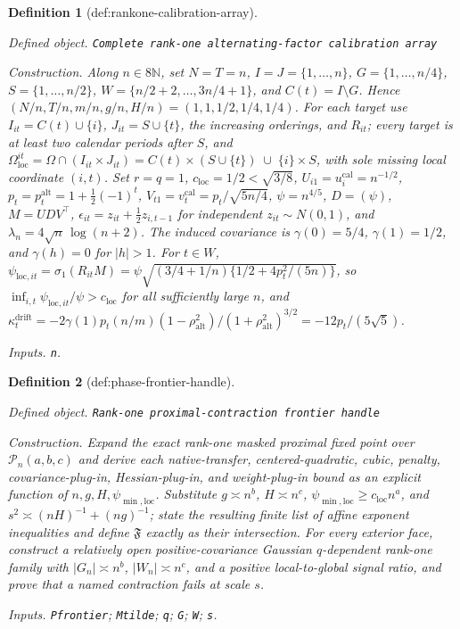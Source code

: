 \documentclass{article}
\newtheorem{definition}{Definition}
\begin{document}
\begin{definition}[def:rankone-calibration-array]\label{def:rankone-calibration-array}
\par\smallskip\noindent\emph{Defined object.} \texttt{Complete rank-\allowbreak{}one alternating-\allowbreak{}factor calibration array}
\par\smallskip\noindent\emph{Construction.} Along \(n\in8\mathbb N\), set \(N=T=n\), \(I=J=\{1,\ldots,n\}\), \(G=\{1,\ldots,n/4\}\), \(S=\{1,\ldots,n/2\}\), \(W=\{n/2+2,\ldots,3n/4+1\}\), and \(C(t)=I\setminus G\). Hence \((N/n,T/n,m/n,g/n,H/n)=(1,1,1/2,1/4,1/4)\). For each target use \(I_{it}=C(t)\cup\{i\}\), \(J_{it}=S\cup\{t\}\), the increasing orderings, and \(R_{it}\); every target is at least two calendar periods after \(S\), and \(\Omega_{\mathrm{loc}}^{it}=\Omega\cap(I_{it}\times J_{it})=C(t)\times(S\cup\{t\})\;\cup\;\{i\}\times S\), with sole missing local coordinate \((i,t)\). Set \(r=q=1\), \(c_{\mathrm{loc}}=1/2<\sqrt{3/8}\), \(U_{i1}=u^{\mathrm{cal}}_i=n^{-1/2}\), \(p_t=p^{\mathrm{alt}}_t=1+\tfrac12(-1)^t\), \(V_{t1}=v^{\mathrm{cal}}_t=p_t/\sqrt{5n/4}\), \(\psi=n^{4/5}\), \(D=(\psi)\), \(M=UDV^{\top}\), \(\epsilon_{it}=z_{it}+\tfrac12z_{i,t-1}\) for independent \(z_{it}\sim N(0,1)\), and \(\lambda_n=4\sqrt n\,\log(n+2)\). The induced covariance is \(\gamma(0)=5/4\), \(\gamma(1)=1/2\), and \(\gamma(h)=0\) for \(|h|>1\). For \(t\in W\), \(\psi_{\mathrm{loc},it}=\sigma_1(R_{it}M)=\psi\sqrt{(3/4+1/n)\{1/2+4p_t^2/(5n)\}}\), so \(\inf_{i,t}\psi_{\mathrm{loc},it}/\psi>c_{\mathrm{loc}}\) for all sufficiently large \(n\), and \(\kappa^{\mathrm{drift}}_t=-2\gamma(1)p_t(n/m)(1-\rho_{\mathrm{alt}}^2)/(1+\rho_{\mathrm{alt}}^2)^{3/2}=-12p_t/(5\sqrt5)\).
\par\smallskip\noindent\emph{Inputs.} \texttt{n}.
\end{definition}

\begin{definition}[def:phase-frontier-handle]\label{def:phase-frontier-handle}
\par\smallskip\noindent\emph{Defined object.} \texttt{Rank-\allowbreak{}one proximal-\allowbreak{}contraction frontier handle}
\par\smallskip\noindent\emph{Construction.} Expand the exact rank-one masked proximal fixed point over \(\mathcal P_n(a,b,c)\) and derive each native-transfer, centered-quadratic, cubic, penalty, covariance-plug-in, Hessian-plug-in, and weight-plug-in bound as an explicit function of \(n,g,H,\psi_{\min,\mathrm{loc}}\). Substitute \(g\asymp n^b\), \(H\asymp n^c\), \(\psi_{\min,\mathrm{loc}}\ge c_{\mathrm{loc}}n^a\), and \(s^2\asymp(nH)^{-1}+(ng)^{-1}\); state the resulting finite list of affine exponent inequalities and define \(\mathfrak F\) exactly as their intersection. For every exterior face, construct a relatively open positive-covariance Gaussian \(q\)-dependent rank-one family with \(|G_n|\asymp n^b\), \(|W_n|\asymp n^c\), and a positive local-to-global signal ratio, and prove that a named contraction fails at scale \(s\).
\par\smallskip\noindent\emph{Inputs.} \texttt{Pfrontier}; \texttt{Mtilde}; \texttt{q}; \texttt{G}; \texttt{W}; \texttt{s}.
\end{definition}
\end{document}
